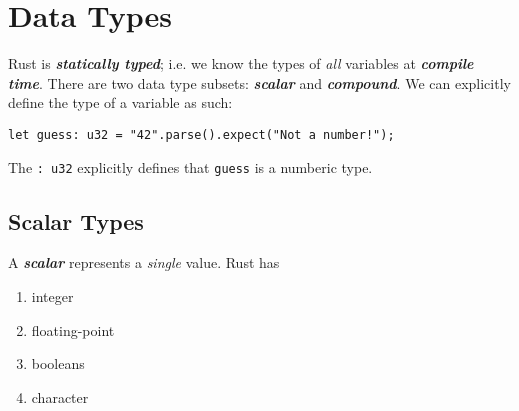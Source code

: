\documentclass{report}
\newcommand{\textib}[1]{\textit{\textbf{{#1}}}}
\begin{document}
\section{Data Types}
Rust is \textib{statically typed}; i.e. we know the types of \textit{all} variables at 
\textib{compile time}. There are two data type subsets: \textib{scalar} and \textib{compound}. We
can explicitly define the type of a variable as such:
\begin{lstlisting}
let guess: u32 = "42".parse().expect("Not a number!");
\end{lstlisting}
The \texttt{: u32} explicitly defines that \texttt{guess}  is a numberic type.


\subsection{Scalar Types}
A \textib{scalar} represents a \textit{single} value. Rust has
\begin{enumerate}[label=\textit{(\roman*)}]
    \item integer
    \item floating-point
    \item booleans
    \item character
\end{enumerate}
\end{document}
